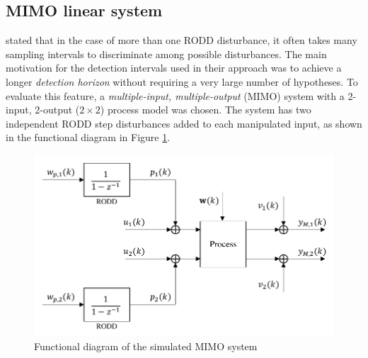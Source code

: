\subsection{MIMO linear system} \label{sim-obs-lin-2}

\cite{robertson_method_1998} stated that in the case of more than one \gls{RODD} disturbance, it often takes many sampling intervals to discriminate among possible disturbances. The main motivation for the detection intervals used in their approach was to achieve a longer \textit{detection horizon} without requiring a very large number of hypotheses. To evaluate this feature, a \textit{multiple-input, multiple-output} (\gls{MIMO}) system with a 2-input, 2-output ($2\times2$) process model was chosen. The system has two independent \gls{RODD} step disturbances added to each manipulated input, as shown in the functional diagram in Figure \ref{fig:sim-sys-diag-2x2}. 
\begin{figure}[htp]
	\centering
	\includegraphics[width=11.5cm]{images/sim-sys-diag-2x2.pdf}
	\caption{Functional diagram of the simulated MIMO system}
	\label{fig:sim-sys-diag-2x2}
\end{figure}

